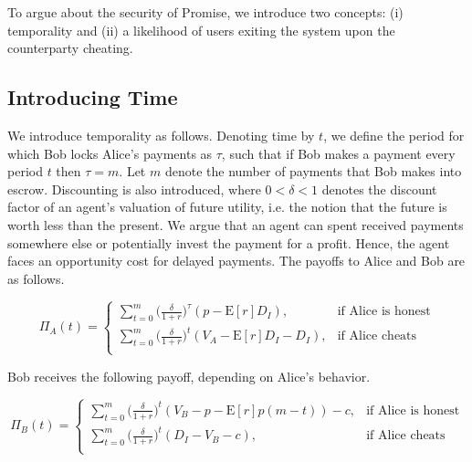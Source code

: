 \documentclass[runningheads]{llncs}
\newcommand{\sys}{Promise\xspace}
\newcommand{\rk}[1]{\todo[linecolor=red,backgroundcolor=red!25,bordercolor=blue,inline,caption={}]{Comment by Rami: #1}}
\begin{document}
To argue about the security of \sys, we introduce two concepts: (i) temporality and (ii) a likelihood of users exiting the system upon the counterparty cheating.

\subsection{Introducing Time}
We introduce temporality as follows.
Denoting time by $t$, we define the period for which Bob locks Alice's payments as $\tau$, such that if Bob makes a payment every period $t$ then $\tau=m$.
Let $m$ denote the number of payments that Bob makes into escrow.
Discounting is also introduced, where $0<\delta<1$ denotes the discount factor of an agent's valuation of future utility, i.e. the notion that the future is worth less than the present.
We argue that an agent can spent received payments somewhere else or potentially invest the payment for a profit.
Hence, the agent faces an opportunity cost for delayed payments.
The payoffs to Alice and Bob are as follows. 

\begin{equation}
\label{eq:time_alice}
\Pi_A(t) = 
\begin{cases}
    \sum_{t=0}^{m} \big( \frac{\delta}{1+r} \big)^{\tau} ( p - \mathrm{E}[r]D_{I}), & \text{if Alice is honest} \\
    \sum_{t=0}^{m} \big( \frac{\delta}{1+r} \big)^{t} (V_A - \mathrm{E}[r]D_{I}-D_{I}), & \text{if Alice cheats} \\
\end{cases}
\end{equation}




Bob receives the following payoff, depending on Alice's behavior.

\begin{equation}
\label{eq:time_bob}
\Pi_B (t) = 
\begin{cases}
\sum_{t=0}^{m} \big( \frac{\delta}{1+r} \big)^t (V_B - p - \mathrm{E}[r]p(m-t)) - c, & \text{if Alice is honest} \\
\sum_{t=0}^{m} \big( \frac{\delta}{1+r} \big)^t (D_{I} -V_B -c) , & \text{if Alice cheats} \\
\end{cases}
\end{equation}
\end{document}
